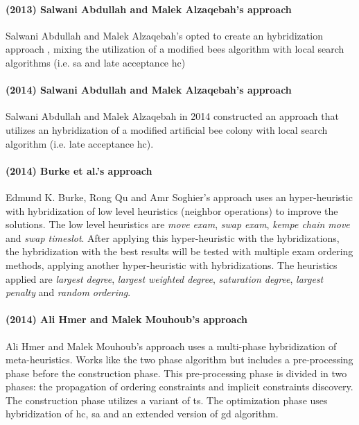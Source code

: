 \paragraph{(2013) Salwani Abdullah and Malek Alzaqebah's approach}
Salwani Abdullah and Malek Alzaqebah's opted to create an hybridization approach \cite{Abdullah2013}, mixing the utilization of a modified bees algorithm with local search algorithms (i.e. \gls{sa} and late acceptance \gls{hc})\\

\paragraph{(2014) Salwani Abdullah and Malek Alzaqebah's approach}
Salwani Abdullah and Malek Alzaqebah in 2014 constructed an approach \cite{Alzaqebah2014} that utilizes an hybridization of a modified artificial bee colony with local search algorithm (i.e. late acceptance \gls{hc}).\\

\paragraph{(2014) Burke et al.'s approach}
Edmund K. Burke, Rong Qu and Amr Soghier's approach \cite{Burke2014} uses an hyper-heuristic with hybridization of low level heuristics (neighbor operations) to improve the solutions. The low level heuristics are \textit{move exam}, \textit{swap exam}, \textit{kempe chain move} and \textit{swap timeslot}. After applying this hyper-heuristic with the hybridizations, the hybridization with the best results will be tested with multiple exam ordering methods, applying another hyper-heuristic with hybridizations. The heuristics applied are \textit{largest degree}, \textit{largest weighted degree}, \textit{saturation degree}, \textit{largest penalty} and \textit{random ordering}.\\

\paragraph{(2014) Ali Hmer and Malek Mouhoub's approach}
Ali Hmer and Malek Mouhoub's approach \cite{Mouhoub2014} uses a multi-phase hybridization of meta-heuristics. Works like the two phase algorithm but includes a pre-processing phase before the construction phase. This pre-processing phase is divided in two phases: the propagation of ordering constraints and implicit constraints discovery. The construction phase utilizes a variant of \gls{ts}. The optimization phase uses hybridization of \gls{hc}, \gls{sa} and an extended version of \gls{gd} algorithm.\\

